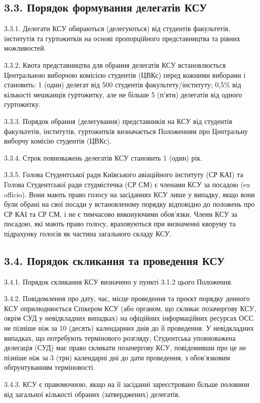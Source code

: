 \subsection*{3.3. Порядок формування делегатів КСУ}
    3.3.1. Делегати КСУ обираються (делегуються) від студентів факультетів, інститутів та гуртожитків на основі пропорційного представництва та рівних можливостей.

    3.3.2. Квота представництва для обрання делегатів КСУ встановлюється Центральною виборчою комісією студентів (ЦВКс) перед кожними виборами і становить: 1 (один) делегат від 500 студентів факультету/інституту; 0,5\% від кількості мешканців гуртожитку, але не більше 5 (п'яти) делегатів від одного гуртожитку.

    3.3.3. Порядок обрання (делегування) представників на КСУ від студентів факультетів, інститутів, гуртожитків визначається Положенням про Центральну виборчу комісію студентів (ЦВКс).

    3.3.4. Строк повноважень делегатів КСУ становить 1 (один) рік.

    3.3.5. Голова Студентської ради Київського авіаційного інституту (СР КАІ) та Голова Студентської ради студмістечка (СР СМ) є членами КСУ за посадою (ex officio). Вони мають право голосу на засіданнях КСУ лише у випадку, якщо вони були обрані на свої посади у встановленому порядку відповідно до положень про СР КАІ та СР СМ, і не є тимчасово виконуючими обов'язки. Члени КСУ за посадою, які мають право голосу, враховуються при визначенні кворуму та підрахунку голосів як частина загального складу КСУ.

\subsection*{3.4. Порядок скликання та проведення КСУ}
    3.4.1. Порядок скликання КСУ визначено у пункті 3.1.2 цього Положення.

    3.4.2. Повідомлення про дату, час, місце проведення та проєкт порядку денного КСУ оприлюднюється Спікером КСУ (або органом, що скликає позачергову КСУ, окрім СУД у невідкладних випадках) на офіційних інформаційних ресурсах ОСС не пізніше ніж за 10 (десять) календарних днів до її проведення. У невідкладних випадках, що потребують термінового розгляду, Студентська уповноважена делегація (СУД) має право скликати позачергову КСУ, повідомивши про це не пізніше ніж за 3 (три) календарні дні до дати проведення, з обов'язковим обґрунтуванням терміновості.

    3.4.3. КСУ є правомочною, якщо на її засіданні зареєстровано більше половини від загальної кількості обраних (затверджених) делегатів.


